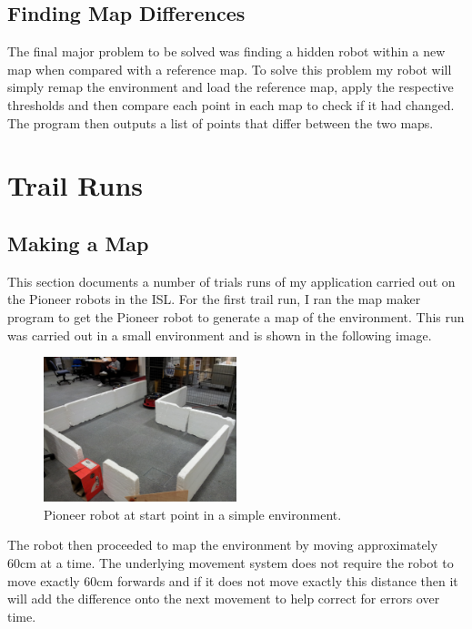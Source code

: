 \documentclass{article}
\begin{document}
\subsection{Finding Map Differences}
The final major problem to be solved was finding a hidden robot within a new map when compared with a reference map. To solve this problem my robot will simply remap the environment and load the reference map, apply the respective thresholds and then compare each point in each map to check if it had changed. The program then outputs a list of points that differ between the two maps.

\section{Trail Runs}

\subsection{Making a Map}

This section documents a number of trials runs of my application carried out on the Pioneer robots in the ISL. For the first trail run, I ran the map maker program to get the Pioneer robot to generate a map of the environment. This run was carried out in a small environment and is shown in the following image.

\begin{figure}[H]
\centering
\includegraphics[width=0.5\textwidth]{img/robot_pics/20130416_132221.jpg}
\caption{Pioneer robot at start point in a simple environment.}
\label{fig:robot-map-start}
\end{figure}

The robot then proceeded to map the environment by moving approximately 60cm at a time. The underlying movement system does not require the robot to move exactly 60cm forwards and if it does not move exactly this distance then it will add the difference onto the next movement to help correct for errors over time.
\end{document}
